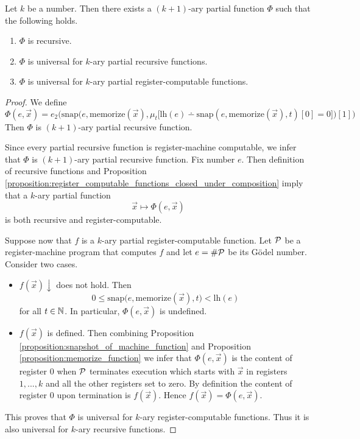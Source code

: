 \documentclass[10pt]{amsart}
\begin{document}
\begin{theorem}\label{theorem:universal_recursive_function}
	Let $k$ be a number. Then there exists a $(k+1)$-ary partial function $\Phi$ such that the following holds.
	\begin{enumerate}[label=\emph{\textbf{(\arabic*)}}, leftmargin=3.0em]
		\item $\Phi$ is recursive.
		\item $\Phi$ is universal for $k$-ary partial recursive functions.
		\item $\Phi$ is universal for $k$-ary partial register-computable functions.
	\end{enumerate}
\end{theorem}
\begin{proof}
	We define
	$$\Phi(e,\vec{x}) = e_2\bigg(\mathrm{snap}\bigg(e,\mathrm{memorize}(\vec{x}),\mu_{t}\big[\mathrm{lh}(e) \dotminus \mathrm{snap}(e,\mathrm{memorize}(\vec{x}),t)[0] = 0\big]\bigg)[1]\bigg)$$
	Then $\Phi$ is $(k+1)$-ary partial recursive function.

	Since every partial recursive function is register-machine computable, we infer that $\Phi$ is $(k+1)$-ary partial recursive function. Fix number $e$. Then definition of recursive functions and Proposition \ref{proposition:register_computable_functions_closed_under_composition} imply that a $k$-ary partial function
	$$\vec{x} \mapsto \Phi(e, \vec{x})$$
	is both recursive and register-computable.

	Suppose now that $f$ is a $k$-ary partial register-computable function. Let ${\mathcal P}$ be a register-machine program that computes $f$ and let $e = \#{\mathcal P}$ be its G{\"o}del number.
	Consider two cases.
	\begin{itemize}
		\item[] $f(\vec{x})\downarrow$ does not hold. Then
			$$0 \leq \mathrm{snap}\big(e,\mathrm{memorize}(\vec{x}),t\big) < \mathrm{lh}(e)$$
			for all $t \in {\mathbb N}$. In particular, $\Phi(e,\vec{x})$ is undefined.
		\item[] $f(\vec{x})$ is defined. Then combining Proposition \ref{proposition:snapshot_of_machine_function} and Proposition \ref{proposition:memorize_function} we infer that $\Phi(e,\vec{x})$ is the content of register $0$ when ${\mathcal P}$ terminates execution which starts with $\vec{x}$ in registers $1,...,k$ and all the other registers set to zero. By definition the content of register $0$ upon termination is $f(\vec{x})$. Hence $f(\vec{x}) = \Phi(e,\vec{x})$.
	\end{itemize}
	This proves that $\Phi$ is universal for $k$-ary register-computable functions. Thus it is also universal for $k$-ary recursive functions.
\end{proof}
\end{document}
